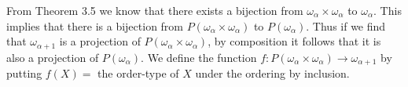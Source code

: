 \begin{solution}
  From Theorem 3.5 we know that there exists a bijection from $\omega_{\alpha} \times \omega_{\alpha}$ to $\omega_{\alpha}$.
  This implies that there is a bijection from $P(\omega_{\alpha} \times \omega_{\alpha})$ to $P(\omega_{\alpha})$.
  Thus if we find that $\omega_{\alpha + 1}$ is a projection of $P(\omega_{\alpha} \times \omega_{\alpha})$, by composition it follows that it is also a projection of $P(\omega_{\alpha})$.
  We define the function $f : P(\omega_{\alpha} \times \omega_{\alpha}) \to \omega_{\alpha + 1}$ by putting $f(X) = $ the order-type of $X$ under the ordering by inclusion.
\end{solution}

